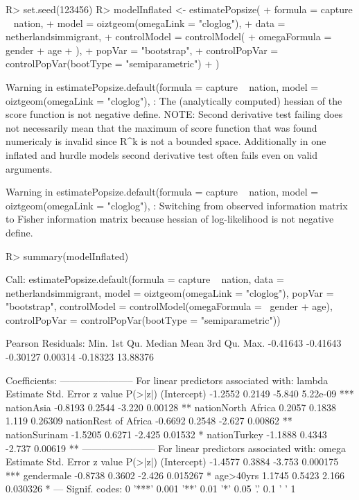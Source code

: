\documentclass[
]{jss}
\newcommand{\1}{\mathcal{I}} \newcommand{\bZero}{\boldsymbol{0}}
\begin{document}
\begin{CodeChunk}
\begin{CodeInput}
R> set.seed(123456)
R> modelInflated <- estimatePopsize(
+     formula = capture ~ nation,
+     model   = oiztgeom(omegaLink = "cloglog"),
+     data    = netherlandsimmigrant,
+     controlModel = controlModel(
+         omegaFormula = ~ gender + age
+     ),
+     popVar = "bootstrap",
+     controlPopVar = controlPopVar(bootType = "semiparametric")
+ )
\end{CodeInput}
\begin{CodeOutput}
Warning in estimatePopsize.default(formula = capture ~ nation, model = oiztgeom(omegaLink = "cloglog"), : The (analytically computed) hessian of the score function is not negative define.
NOTE: Second derivative test failing does not 
        necessarily mean that the maximum of score function that was found 
        numericaly is invalid since R^k is not a bounded space.
Additionally in one inflated and hurdle models second derivative test often fails even on valid arguments.
\end{CodeOutput}
\begin{CodeOutput}
Warning in estimatePopsize.default(formula = capture ~ nation, model =
oiztgeom(omegaLink = "cloglog"), : Switching from observed information matrix
to Fisher information matrix because hessian of log-likelihood is not negative
define.
\end{CodeOutput}
\begin{CodeInput}
R> summary(modelInflated)
\end{CodeInput}
\begin{CodeOutput}

Call:
estimatePopsize.default(formula = capture ~ nation, data = netherlandsimmigrant, 
    model = oiztgeom(omegaLink = "cloglog"), popVar = "bootstrap", 
    controlModel = controlModel(omegaFormula = ~gender + age), 
    controlPopVar = controlPopVar(bootType = "semiparametric"))

Pearson Residuals:
    Min.  1st Qu.   Median     Mean  3rd Qu.     Max. 
-0.41643 -0.41643 -0.30127  0.00314 -0.18323 13.88376 

Coefficients:
-----------------------
For linear predictors associated with: lambda 
                     Estimate Std. Error z value  P(>|z|)    
(Intercept)           -1.2552     0.2149  -5.840 5.22e-09 ***
nationAsia            -0.8193     0.2544  -3.220  0.00128 ** 
nationNorth Africa     0.2057     0.1838   1.119  0.26309    
nationRest of Africa  -0.6692     0.2548  -2.627  0.00862 ** 
nationSurinam         -1.5205     0.6271  -2.425  0.01532 *  
nationTurkey          -1.1888     0.4343  -2.737  0.00619 ** 
-----------------------
For linear predictors associated with: omega 
            Estimate Std. Error z value  P(>|z|)    
(Intercept)  -1.4577     0.3884  -3.753 0.000175 ***
gendermale   -0.8738     0.3602  -2.426 0.015267 *  
age>40yrs     1.1745     0.5423   2.166 0.030326 *  
---
Signif. codes:  0 '***' 0.001 '**' 0.01 '*' 0.05 '.' 0.1 ' ' 1


\end{CodeOutput}
\end{CodeChunk}
\end{document}
